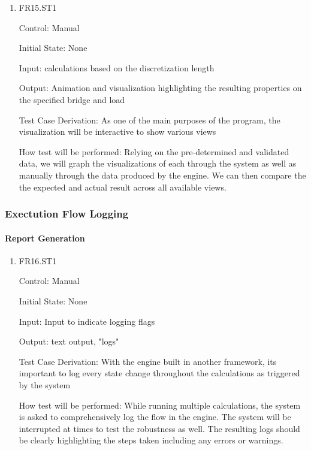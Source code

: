 \documentclass[12pt, titlepage]{article}
\begin{document}
\begin{enumerate}

\item{FR15.ST1\\}

Control: Manual
					
Initial State: None
					
Input: calculations based on the discretization length 
					
Output:  Animation and visualization highlighting the resulting properties on the specified bridge and load 

Test Case Derivation: As one of the main purposes of the program, the visualization will be interactive to show various views

How test will be performed: Relying on the pre-determined and validated data, we will graph the visualizations of each through the system as well as manually through the data produced by the engine. We can then compare the the expected and actual result across all available views. 

\end{enumerate}

\subsubsection{Exectution Flow Logging}

\paragraph{Report Generation}

\begin{enumerate}

\item{FR16.ST1\\}

Control: Manual
					
Initial State: None
					
Input: Input to indicate logging flags 
					
Output: text output, "logs"

Test Case Derivation: With the engine built in another framework, its important to log every state change throughout the calculations as triggered by the system

How test will be performed: While running multiple calculations, the system is asked to comprehensively log the flow in the engine. The system will be interrupted at times to test the robustness as well. The resulting logs should be clearly highlighting the steps taken including any errors or warnings.
					
\end{enumerate}
\end{document}
